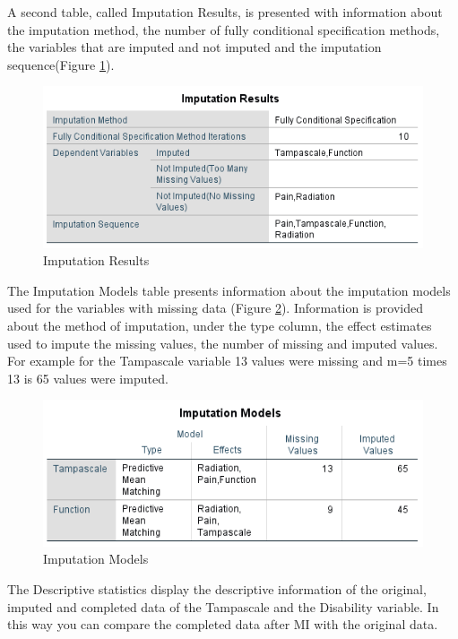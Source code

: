 \documentclass[
]{book}
\begin{document}
A second table, called Imputation Results, is presented with information about the imputation method, the number of fully conditional specification methods, the variables that are imputed and not imputed and the imputation sequence(Figure \ref{fig:tab4-5}).

\begin{figure}

{\centering \includegraphics[width=0.9\linewidth]{images/tab4.5} 

}

\caption{Imputation Results}\label{fig:tab4-5}
\end{figure}

The Imputation Models table presents information about the imputation models used for the variables with missing data (Figure \ref{fig:tab4-6}). Information is provided about the method of imputation, under the type column, the effect estimates used to impute the missing values, the number of missing and imputed values. For example for the Tampascale variable 13 values were missing and m=5 times 13 is 65 values were imputed.

\begin{figure}

{\centering \includegraphics[width=0.9\linewidth]{images/tab4.6} 

}

\caption{Imputation Models}\label{fig:tab4-6}
\end{figure}

The Descriptive statistics display the descriptive information of the original, imputed and completed data of the Tampascale and the Disability variable. In this way you can compare the completed data after MI with the original data.
\end{document}
